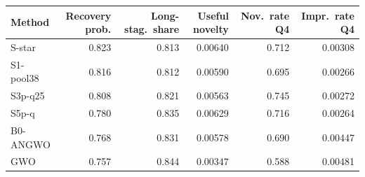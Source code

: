 \begin{tabular}{lrrrrr}
\toprule
Method & Recovery prob. & Long-stag.\ share & Useful novelty & Nov.\ rate Q4 & Impr.\ rate Q4\\
\midrule
S-star & 0.823 & 0.813 & 0.00640 & 0.712 & 0.00308 \\
S1-pool38 & 0.816 & 0.812 & 0.00590 & 0.695 & 0.00266 \\
S3p-q25 & 0.808 & 0.821 & 0.00563 & 0.745 & 0.00272 \\
S5p-q & 0.780 & 0.835 & 0.00629 & 0.716 & 0.00264 \\
B0-ANGWO & 0.768 & 0.831 & 0.00578 & 0.690 & 0.00447 \\
GWO & 0.757 & 0.844 & 0.00347 & 0.588 & 0.00481 \\
\bottomrule
\end{tabular}